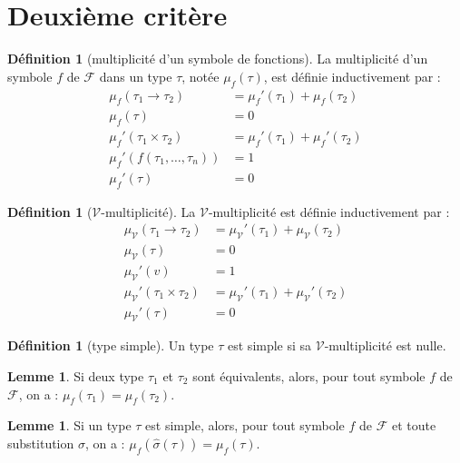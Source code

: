 \documentclass[a4paper]{report}
\theoremstyle{definition}
\newtheorem{definition}[theoreme]{Définition}
\newtheorem{lemme}[theoreme]{Lemme}
\newcommand{\V}{\mathscr V}
\newcommand{\F}{\mathscr F}
\begin{document}

\section{Deuxième critère}

\begin {definition} [multiplicité d'un symbole de fonctions]
	La multiplicité d'un symbole $f$ de $\F$ dans un type $\tau$, notée $\mu_f (\tau)$, est définie inductivement par :
	\begin{align*}
			\mu_f (\tau_1 \rightarrow \tau_2) &=
			\mu_f' (\tau_1) + \mu_f (\tau_2)
		\\
			\mu_f (\tau) &=
			0
		\\
			\mu_f' (\tau_1 \times \tau_2) &=
			\mu_f' (\tau_1) + \mu_f' (\tau_2)
		\\
			\mu_f' (f (\tau_1, \dots, \tau_n)) &=
			1
		\\
			\mu_f' (\tau) &=
			0
	\end{align*}
\end{definition}

\begin{definition}[$\V$-multiplicité]
	La $\V$-multiplicité est définie inductivement par :
	\begin{align*}
			\mu_\V (\tau_1 \rightarrow \tau_2) &=
			\mu_\V' (\tau_1) + \mu_\V (\tau_2)
		\\
			\mu_\V (\tau) &=
			0
		\\
			\mu_\V' (v) &=
			1
		\\
			\mu_\V' (\tau_1 \times \tau_2) &=
			\mu_\V' (\tau_1) + \mu_\V' (\tau_2)
		\\
			\mu_\V' (\tau) &=
			0
	\end{align*}
\end{definition}

\begin{definition}[type simple]
	Un type $\tau$ est simple si sa $\V$-multiplicité est nulle.
\end{definition}

\begin{lemme} \label{mu_equiv}
	Si deux type $\tau_1$ et $\tau_2$ sont équivalents, alors, pour tout symbole $f$ de $\F$, on a : $\mu_f (\tau_1) = \mu_f (\tau_2)$.
\end{lemme}

\begin{lemme} \label{mu_subst_simple}
	Si un type $\tau$ est simple, alors, pour tout symbole $f$ de $\F$ et toute substitution $\sigma$, on a : $\mu_f (\hat \sigma (\tau)) = \mu_f (\tau)$.
\end{lemme}
\end{document}
